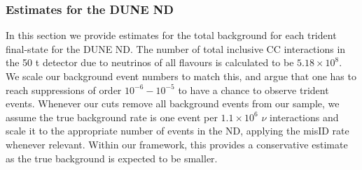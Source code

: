 \subsubsection{\label{sec:DUNE_bg_rates}Estimates for the DUNE ND}

In this section we provide estimates for the total background for each trident final-state for the DUNE ND. The number of total inclusive CC interactions in the 50 t detector due to neutrinos of all flavours is calculated to be $5.18 \times 10^8$. We scale our background event numbers to match this, and argue that one has to reach suppressions of order $10^{-6} - 10^{-5}$ to have a chance to observe trident events. Whenever our cuts remove all background events from our sample, we assume the true background rate is one event per $1.1\times10^6$ $\nu$ interactions and scale it to the appropriate number of events in the ND, applying the misID rate whenever relevant. Within our framework, this provides a conservative estimate as the true background is expected to be smaller.

